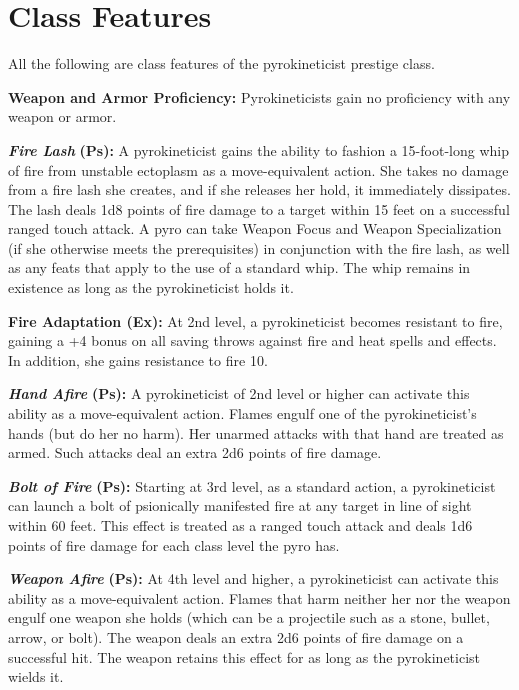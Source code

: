 \documentclass{article}
\begin{document}
\vspace{12pt}
\section*{\textbf{Class Features}}

All the following are class features of the pyrokineticist prestige class.

\textbf{Weapon and Armor Proficiency: }Pyrokineticists gain no proficiency with 
any weapon or armor.

\textit{\textbf{Fire Lash }}\textbf{(Ps):} A pyrokineticist gains the ability to 
fashion a 15-foot-long whip of fire from unstable ectoplasm as a move-equivalent 
action. She takes no damage from a fire lash she creates, and if she releases her 
hold, it immediately dissipates. The lash deals 1d8 points of fire damage to a 
target within 15 feet on a successful ranged touch attack. A pyro can take Weapon 
Focus and Weapon Specialization (if she otherwise meets the prerequisites) in conjunction 
with the fire lash, as well as any feats that apply to the use of a standard whip. 
The whip remains in existence as long as the pyrokineticist holds it.

\textbf{Fire Adaptation (Ex):} At 2nd level, a pyrokineticist becomes resistant 
to fire, gaining a +4 bonus on all saving throws against fire and heat spells and 
effects. In addition, she gains resistance to fire 10.

\textit{\textbf{Hand Afire }}\textbf{(Ps):} A pyrokineticist of 2nd level or higher 
can activate this ability as a move-equivalent action. Flames engulf one of the 
pyrokineticist's hands (but do her no harm). Her unarmed attacks with that hand 
are treated as armed. Such attacks deal an extra 2d6 points of fire damage. 

\textit{\textbf{Bolt of Fire }}\textbf{(Ps):} Starting at 3rd level, as a standard 
action, a pyrokineticist can launch a bolt of psionically manifested fire at any 
target in line of sight within 60 feet. This effect is treated as a ranged touch 
attack and deals 1d6 points of fire damage for each class level the pyro has.

\textit{\textbf{Weapon Afire }}\textbf{(Ps):} At 4th level and higher, a pyrokineticist 
can activate this ability as a move-equivalent action. Flames that harm neither 
her nor the weapon engulf one weapon she holds (which can be a projectile such 
as a stone, bullet, arrow, or bolt). The weapon deals an extra 2d6 points of fire 
damage on a successful hit. The weapon retains this effect for as long as the pyrokineticist 
wields it.
\end{document}
